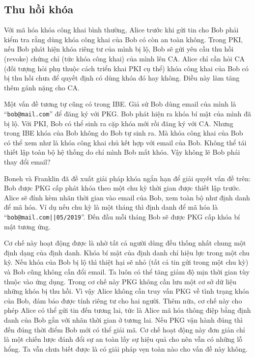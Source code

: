 \documentclass[class=report, crop=false]{standalone}
\begin{document}
		\subsection{Thu hồi khóa}
			Với mã hóa khóa công khai bình thường, Alice trước khi gửi tin cho Bob phải kiểm tra rằng dùng khóa công khai của Bob có còn an toàn không. Trong PKI, nếu Bob phát hiện khóa riêng tư của mình bị lộ, Bob sẽ gửi yêu cầu thu hồi (revoke) chứng chỉ (tức khóa công khai) của mình lên CA. Alice chỉ cần hỏi CA (đối tượng hỏi phụ thuộc cách triển khai PKI cụ thể) khóa công khai của Bob có bị thu hồi chưa để quyết định có dùng khóa đó hay không. Điều này làm tăng thêm gánh nặng cho CA.

			Một vấn đề tương tự cũng có trong IBE. Giả sử Bob dùng email của mình là ``\texttt{bob@mail.com}'' để đăng ký với PKG. Bob phát hiện ra khóa bí mật của mình đã bị lộ. Với PKI, Bob có thể sinh ra cặp khóa mới rồi đăng ký với CA. Nhưng trong IBE khóa của Bob không do Bob tự sinh ra. Mà khóa công khai của Bob có thể xem như là khóa công khai chủ kết hợp với email của Bob. Không thể tái thiết lập toàn bộ hệ thống do chỉ mình Bob mất khóa. Vậy không lẽ Bob phải thay đổi email?

			Boneh và Franklin \cite{DBLP:conf/crypto/BonehF01} đã đề xuất giải pháp khóa ngắn hạn để giải quyết vấn đề trên: Bob được PKG cấp phát khóa theo một chu kỳ thời gian được thiết lập trước. Alice sẽ đính kèm nhãn thời gian vào email của Bob, xem toàn bộ như định danh để mã hóa. Ví dụ nếu chu kỳ là một tháng thì định danh để mã hóa là ``\texttt{bob@mail.com||05/2019}''. Đến đầu mỗi tháng Bob sẽ được PKG cấp khóa bí mật tương ứng.
			
			Cơ chế này hoạt động được là nhờ tất cả người dùng đều thống nhất chung một định dạng của định danh. Khóa bí mật của định danh chỉ hiệu lực trong một chu kỳ. Nếu khóa của Bob bị lộ thì thiệt hại sẽ nhỏ (tất cả tin gửi trong một chu kỳ) và Bob cũng không cần đổi email. Ta luôn có thể tăng giảm độ mịn thời gian tùy thuộc vào ứng dụng. Trong cơ chế này PKG không cần lưu một cơ sở dữ liệu những khóa bị thu hồi. Vì vậy Alice không cần truy vấn PKG về tình trạng khóa của Bob, đảm bảo được tính riêng tư cho hai người. Thêm nữa, cơ chế này cho phép Alice có thể gửi tin đến tương lai, tức là Alice mã hóa thông điệp bằng định danh của Bob gắn với nhãn thời gian ở tương lai. Nếu PKG vận hành đúng thì đến đúng thời điểm Bob mới có thể giải mã. Cơ chế hoạt động này đơn giản chỉ là một chiến lược đánh đổi sự an toàn lấy sự hiệu quả cho nên vẫn có những lỗ hổng. Ta vẫn chưa biết được là có giải pháp vẹn toàn nào cho vấn đề này không.
\end{document}
